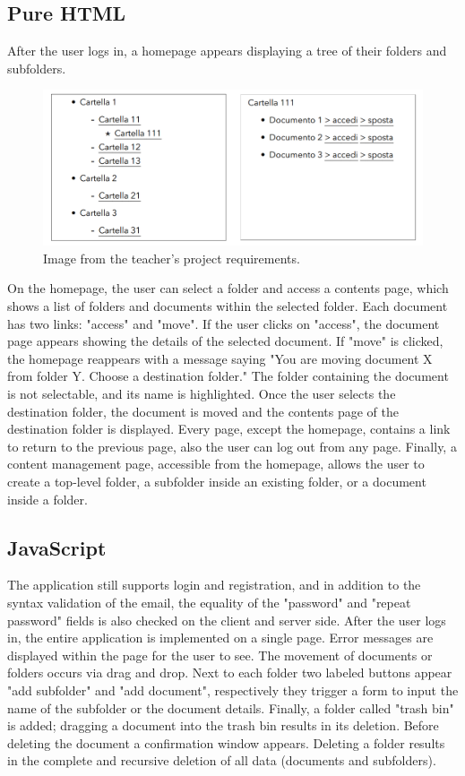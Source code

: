 \documentclass[a4paper,12pt]{article}
\begin{document}
\subsection{Pure HTML}
After the user logs in, a homepage appears displaying a tree of their folders and subfolders.
\begin{figure}[h]
    \centering
    \includegraphics[width=1.0\textwidth]{HTML/HTMLTree.png}
    \caption{Image from the teacher's project requirements.}
    \label{fig:HTMLTree}
\end{figure}
On the homepage, the user can select a folder and access a contents page, which shows a list of folders and documents within the selected folder. Each document has two links: "access" and "move". If the user clicks on "access", the document page appears showing the details of the selected document. If "move" is clicked, the homepage reappears with a message saying "You are moving document X from folder Y. Choose a destination folder." The folder containing the document is not selectable, and its name is highlighted. Once the user selects the destination folder, the document is moved and the contents page of the destination folder is displayed. Every page, except the homepage, contains a link to return to the previous page, also the user can log out from any page. Finally, a content management page, accessible from the homepage, allows the user to create a top-level folder, a subfolder inside an existing folder, or a document inside a folder.

\newpage
\subsection{JavaScript}
The application still supports login and registration, and in addition to the syntax validation of the email, the equality of the "password" and "repeat password" fields is also checked on the client and server side. After the user logs in, the entire application is implemented on a single page. Error messages are displayed within the page for the user to see. The movement of documents or folders occurs via drag and drop. Next to each folder two labeled buttons appear "add subfolder" and "add document", respectively they trigger a form to input the name of the subfolder or the document details. Finally, a folder called "trash bin" is added; dragging a document into the trash bin results in its deletion. Before deleting the document a confirmation window appears. Deleting a folder results in the complete and recursive deletion of all data (documents and subfolders).
\end{document}
